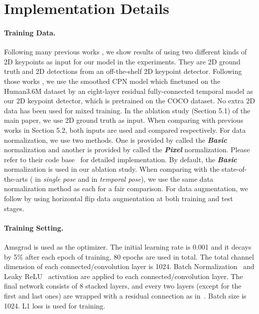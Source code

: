 \documentclass[runningheads]{llncs}
\begin{document}
\section{Implementation Details} 
\label{sec:imple}


\paragraph{\textbf{Training Data.}} Following many previous works \cite{pavllo20193d,martinez2017simple,fang2018learning,wang2019generalizing,zhao2019semantic,ci2019optimizing}, we show results of using two different kinds of 2D keypoints as input for our model in the experiments. They are 2D ground truth and 2D detections from an off-the-shelf 2D keypoint detector. Following those works \cite{pavllo20193d,cai2019exploiting,lin2019trajectory}, we use the smoothed CPN model \cite{chen2018cascaded} which finetuned on the Human3.6M dataset by an eight-layer residual fully-connected temporal model as our 2D keypoint detector, which is pretrained on the COCO dataset. No extra 2D data has been used for mixed training. In the ablation study (Section 5.1) of the main paper, we use 2D ground truth as input. When comparing with previous works in Section 5.2, both inputs are used and compared respectively. For data normalization, we use two methods. One is provided by \cite{pavllo20193d} called the \emph{\textbf{Basic}} normalization and another is provided by \cite{ci2019optimizing} called the \emph{\textbf{Pixel}} normalization. Please refer to their code base~\cite{tempconvcode,lcncode} for detailed implementation. By default, the \emph{\textbf{Basic}} normalization is used in our ablation study. When comparing with the state-of-the-arts (\cite{ci2019optimizing} in \emph{single pose} and \cite{pavllo20193d} in \emph{temporal pose}), we use the same data normalization method as each for a fair comparison.
For data augmentation, we follow \cite{pavllo20193d,ci2019optimizing} by using horizontal flip data augmentation at both training and test stages.










\paragraph{\textbf{Training Setting.}} Amsgrad \cite{reddi2019convergence} is used as the optimizer. The initial learning rate is 0.001 and it decays by 5\% after each epoch of training. 80 epochs are used in total.
The total channel dimension of each connected/convolution layer is 1024. Batch Normalization~\cite{ioffe2015batch} and Leaky ReLU~\cite{xu2015empirical} activation are applied to each connected/convolution layer. The final network consists of 8 stacked layers, and every two layers (except for the first and last ones) are wrapped with a residual connection as in~\cite{martinez2017simple,pavllo20193d}. Batch size is 1024. L1 loss is used for training.
\end{document}
